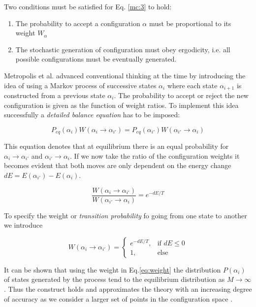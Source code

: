 Two conditions must be satisfied for Eq. \ref{mc:3} to hold:

\begin{enumerate}
	\item The probability to accept a configuration $\alpha$ must be proportional to its weight $W_{\alpha}$
	\item The stochastic generation of configuration must obey ergodicity, i.e. all possible configurations must be eventually generated.
\end{enumerate}

Metropolis et al. advanced conventional thinking at the time by introducing the idea of using a Markov process of successive states $\alpha_{i}$ where each state $\alpha_{i+1}$ is constructed from a previous state $\alpha_i$. The probability to accept or reject the new configuration is given as the function of weight ratios. To implement this idea successfully a \textit{detailed balance
equation} has to be imposed:

\begin{equation}
	P_{eq}(\alpha_{i})W(\alpha_{i} \to \alpha_{i'}) = P_{eq}(\alpha_{i'})W(\alpha_{i'} \to \alpha_{i}) 
\end{equation}

This equation denotes that at equilibrium there is an equal probability
for $\alpha_{i} \to \alpha_{i'}$ and $\alpha_{i'} \to \alpha_{i}$. If we now take the ratio of the configuration weights it becomes evident that both moves are only dependent on the energy change $dE = E(\alpha_{i'}) - E(\alpha_{i})$.

\begin{equation}
\label{eq:balance1}
	\frac{W(\alpha_{i} \to \alpha_{i'})}{W(\alpha_{i'} \to \alpha_{i})} = e^{-dE/T}
\end{equation}

To specify the weight or \textit{transition probability} fo going from one state to another we introduce 

\begin{equation}
	\label{eq:weight}
	W(\alpha_{i} \to \alpha_{i'}) = \begin{cases}
								e^{-dE/T}, & \mbox{if } dE \leq 0\\
								1, & \mbox{else}
						     \end{cases}
\end{equation}

It can be shown that using the weight in Eq.\ref{eq:weight} the distribution $P(\alpha_{i})$ of states generated by the process tend to the equilibrium distribution as $M \to \infty$. Thus the construct holds and approximates the theory with an increasing degree of accuracy as we consider a larger set of points in the configuration space \cite{kotze}.

